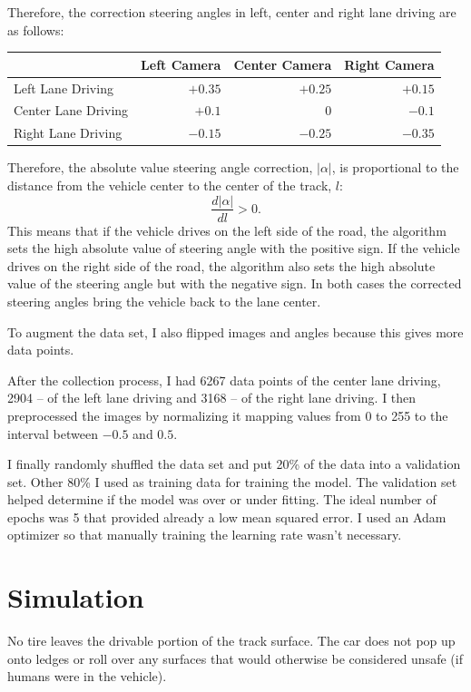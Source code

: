 \documentclass[a4paper,12pt]{article}
\begin{document}
\noindent Therefore, the correction steering angles in left, center and right lane driving are as follows:
\begin{center}
  \begin{tabular}{| l | r | r | r |}
  \hline
   & Left Camera & Center Camera & Right Camera\\
    \hline
    Left Lane Driving & $+0.35$ & $+0.25$ & $+0.15$ \\ 
    Center Lane Driving & $+0.1$ & $0$ & $-0.1$ \\ 
    Right Lane Driving &  $-0.15$ & $-0.25$ & $-0.35$ \\
    \hline
  \end{tabular}
\end{center}
Therefore, the absolute value steering angle correction, $|\alpha|$, is proportional to the distance from the vehicle center to the center of the track, $l$:
$$
 \frac{d |\alpha|}{dl} > 0.
$$
\noindent This means that if the vehicle drives on the left side of the road, the algorithm sets the high absolute value of steering angle with the positive sign. If the vehicle drives on the right side of the road, the algorithm also sets the high absolute value of the steering angle but with the negative sign. In both cases the corrected steering angles bring the vehicle back to the lane center.

To augment the data set, I also flipped images and angles because this gives more data points.

After the collection process, I had 6267 data points of the center lane driving, 2904 -- of the left lane driving and 3168 -- of the right lane driving. I then preprocessed the images by normalizing it mapping values from 0 to 255 to the interval between $-0.5$ and $0.5$.

I finally randomly shuffled the data set and put 20\% of the data into a validation set. Other 80\% I used as training data for training the model. The validation set helped determine if the model was over or under fitting. The ideal number of epochs was 5 that provided already a low mean squared error. I used an Adam optimizer so that manually training the learning rate wasn't necessary.

\section{Simulation}
No tire leaves the drivable portion of the track surface. The car does not pop up onto ledges or roll over any surfaces that would otherwise be considered unsafe (if humans were in the vehicle).
\end{document}
